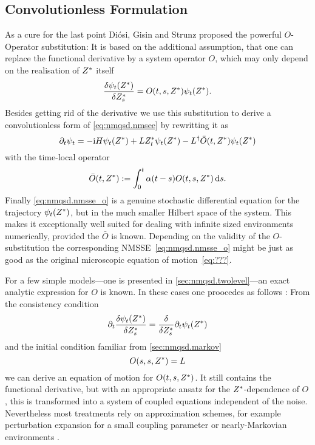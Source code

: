 \subsection{Convolutionless Formulation}
\label{sub:nmqsd.lin_nmsse.convolutionless}

As a cure for the last point Diósi, Gisin and Strunz \cite{DiGiSt98_nmqsd} proposed the powerful $O$-Operator substitution:
It is based on the additional assumption, that one can replace the functional derivative by a system operator $O$, which may only depend on the realisation of ${Z}^*$ itself
\begin{equation}
  \frac{\delta \psi_t({Z}^*)}{\delta {Z}^*_s} = O(t, s, {Z}^*) \psi_t({Z}^*).
  \label{eq:nmqsd.o_substition}
\end{equation}
Besides getting rid of the derivative we use this substitution to derive a convolutionless form of \autoref{eq:nmqsd.nmsee} by rewritting it as
\begin{equation}
  \partial_t \psi_t = -\mathrm{i}H\psi_t({Z}^*)  +  L{Z}^*_t\psi_t({Z}^*)  -  L^\dagger \bar O(t, {Z}^*) \psi_t({Z}^*)
  \label{eq:nmqsd.nmsse_o}
\end{equation}
with the time-local operator
\begin{equation}
  \bar O(t, {Z}^*) := \int_0^t \alpha(t - s) O(t, s, {Z}^*) \, \mathrm{d} s.
  \label{eq:nmqsd.o_bar}
\end{equation}
Finally \autoref{eq:nmqsd.nmsse_o} is a genuine stochastic differential equation for the trajectory $\psi_t({Z}^*)$, but in the much smaller Hilbert space of the system.
This makes it exceptionally well suited for dealing with infinite sized environments numerically, provided the $\bar O$ is known.
Depending on the validity of the $O$-substitution the corresponding NMSSE~\ref{eq:nmqsd.nmsse_o} might be just as good as the original microscopic equation of motion~\ref{eq:???}.

For a few simple models---one is presented in \autoref{sec:nmqsd.twolevel}---an exact analytic expression for $O$ is known.
In these cases one proocedes as follows \cite{DiGiSt98_nmqsd}:
From the consistency condition
\begin{equation}
  \partial_t \frac{\delta \psi_t({Z}^*)}{\delta {Z}^*_s} = \frac{\delta}{\delta {Z}^*_s} \partial_t \psi_t({Z}^*)
  \label{eq:nmqsd.consistency_condition}
\end{equation}
and the initial condition familiar from \autoref{sec:nmqsd.markov}
\begin{equation}
  O(s, s, {Z}^*) = L
  \label{eq:nmqsd.o_initial}
\end{equation}
we can derive an equation of motion for $O(t, s, {Z}^*)$.
It still contains the functional derivative, but with an appropriate ansatz for the ${Z}^*$-dependence of $O$, this is transformed into a system of coupled equations independent of the noise.
Nevertheless most treatments rely on approximation schemes, for example perturbation expansion for a small coupling parameter or nearly-Markovian environments \cite{YuDiGiSt99_pertubation}.

